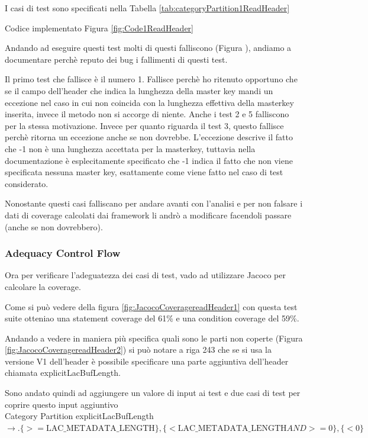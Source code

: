 \documentclass[12pt, a4paper]{article}
\begin{document}
I casi di test sono specificati nella Tabella \ref{tab:categoryPartition1ReadHeader}

Codice implementato Figura \ref{fig:Code1ReadHeader}


Andando ad eseguire questi test molti di questi falliscono (Figura ), andiamo a documentare perchè reputo 
dei bug i fallimenti di questi test.


Il primo test che fallisce è il numero 1. Fallisce perchè ho ritenuto opportuno che se il campo dell'header 
che indica la lunghezza della master key mandi un eccezione nel caso in cui non coincida con la lunghezza effettiva 
della masterkey inserita, invece il metodo non si accorge di niente.
Anche i test 2 e 5 falliscono per la stessa motivazione. 
Invece per quanto riguarda il test 3, questo fallisce perchè ritorna un eccezione anche se non dovrebbe. 
L'eccezione descrive il fatto che -1 non è una lunghezza accettata per la masterkey, tuttavia nella documentazione è
esplecitamente specificato che -1 indica il fatto che non viene specificata nessuna master key, esattamente come viene 
fatto nel caso di test considerato.

Nonostante questi casi falliscano per andare avanti con l'analisi e per non falsare i dati di coverage calcolati
dai framework li andrò a modificare facendoli passare (anche se non dovrebbero).


\subsubsection{Adequacy Control Flow}
Ora per verificare l'adeguatezza dei casi di test, vado ad utilizzare
Jacoco per calcolare la coverage.

Come si può vedere della figura \ref{fig:JacocoCoveragereadHeader1} con questa test suite otteniao
una statement coverage del 61\% e una condition coverage del 59\%.

Andando a vedere in maniera più specifica quali sono le parti non coperte (Figura \ref{fig:JacocoCoveragereadHeader2})
si può notare a riga 243 che se si usa la versione V1 dell'header è possibile specificare una parte aggiuntiva dell'header
chiamata explicitLacBufLength.

Sono andato quindi ad aggiungere un valore di input ai test e due casi di test per coprire questo input aggiuntivo \\
Category Partition explicitLacBufLength $\rightarrow.
\{ >= \text{LAC\_METADATA\_LENGTH} \},
\{ <  \text{LAC\_METADATA\_LENGTH} AND >= 0\}, 
\{ < 0 \}$ 
\end{document}
